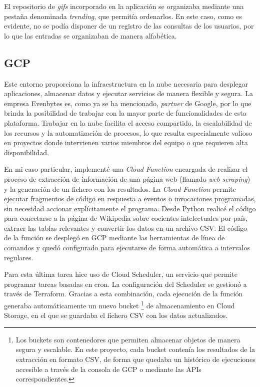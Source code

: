 El repositorio de \textit{gifs} incorporado en la aplicación se organizaba mediante una pestaña denominada \textit{trending}, que permitía ordenarlos. En este caso, como es evidente, no se podía disponer de un registro de las consultas de los usuarios, por lo que las entradas se organizaban de manera alfabética.
%
%
\subsection{GCP}
%
%
Este entorno proporciona la infraestructura en la nube necesaria para desplegar aplicaciones, almacenar datos y ejecutar servicios de manera flexible y segura. La empresa Evenbytes es, como ya se ha mencionado, \textit{partner} de Google, por lo que brinda la posibilidad de trabajar con la mayor parte de funcionalidades de esta plataforma. Trabajar en la nube facilita el acceso compartido, la escalabilidad de los recursos y la automatización de procesos, lo que resulta especialmente valioso en proyectos donde intervienen varios miembros del equipo o que requieren alta disponibilidad.

En mi caso particular, implementé una \textit{Cloud Function} encargada de realizar el proceso de extracción de información de una página web (llamado \textit{web scraping}) y la generación de un fichero con los resultados. La \textit{Cloud Function} permite ejecutar fragmentos de código en respuesta a eventos o invocaciones programadas, sin necesidad accionar explícitamente el programa. Desde Python realicé el código para conectarse a la página de Wikipedia sobre cocientes intelectuales por país, extraer las tablas relevantes y convertir los datos en un archivo CSV. El código de la función se desplegó en GCP mediante las herramientas de línea de comandos y quedó configurado para ejecutarse de forma automática a intervalos regulares.

Para esta última tarea hice uso de Cloud Scheduler, un servicio que permite programar tareas basadas en cron. La configuración del Scheduler se gestionó a través de Terraform. Gracias a esta combinación, cada ejecución de la función generaba automáticamente un nuevo bucket \footnote{
Los buckets son contenedores que permiten almacenar objetos de manera segura y escalable. En este proyecto, cada bucket contenía los resultados de la extracción en formato CSV, de forma que quedaba un histórico de ejecuciones accesible a través de la consola de GCP o mediante las APIs correspondientes.} de almacenamiento en Cloud Storage, en el que se guardaba el fichero CSV con los datos actualizados.

